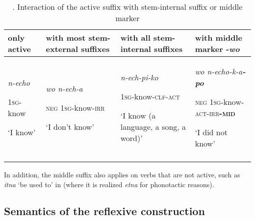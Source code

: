 \documentclass[output=paper]{langscibook}
\begin{document}
\begin{table}
\caption{\label{tab:Rose:3}. Interaction of the active suffix with stem-internal suffix or middle marker}


\begin{tabularx}{\textwidth}{p{2.5cm}XXX}

\lsptoprule
only active & with most stem-external suffixes & with all stem-internal suffixes & with middle marker -\textit{wo}\\
\hline
\textit{n-echo}

1\textsc{sg}-know

‘I know’ & \textit{wo n-ech-a}

\textsc{neg} \textsc{1sg}-know-\textsc{irr}

‘I don’t know’ & \textit{n-ech-pi-ko}

1\textsc{sg}-know-\textsc{clf-act}

‘I know (a language, a song, a word)’ & \textit{wo n-echo-k-a}\textbf{\textit{-po}}

\textsc{neg} \textsc{1sg}-know-\textsc{act-irr\textbf{-mid}}

 ‘I did not know’\\
\lspbottomrule
\end{tabularx}
\end{table}

In addition, the middle suffix also applies on verbs that are not active, such as \textit{itna} ‘be used to’ in  (where it is realized \textit{etna} for phonotactic reasons).


\subsection{Semantics of the reflexive construction}
\label{sec:Rose:3.2}
\end{document}
